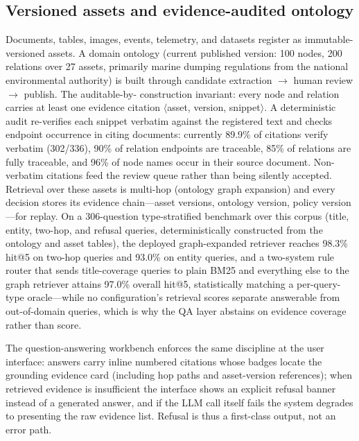 \documentclass[conference]{IEEEtran}
\begin{document}
\subsection{Versioned assets and evidence-audited ontology}
Documents, tables, images, events, telemetry, and datasets register as
immutable-versioned assets. A domain ontology (current published version:
100 nodes, 200 relations over 27 assets, primarily marine dumping
regulations from the national environmental authority) is built through
candidate extraction $\to$ human review $\to$ publish. The auditable-by-
construction invariant: every node and relation carries at least one
evidence citation $\langle$asset, version, snippet$\rangle$. A
deterministic audit re-verifies each snippet verbatim against the registered
text and checks endpoint occurrence in citing documents: currently 89.9\%
of citations verify verbatim (302/336), 90\% of relation endpoints are
traceable, 85\% of relations are fully traceable, and 96\% of node names
occur in their source document. Non-verbatim citations feed the review
queue rather than being silently accepted. Retrieval over these assets is
multi-hop (ontology graph expansion) and every decision stores its evidence
chain---asset versions, ontology version, policy version---for replay. On a
306-question type-stratified benchmark over this corpus (title, entity,
two-hop, and refusal queries, deterministically constructed from the
ontology and asset tables), the deployed graph-expanded retriever reaches
98.3\% hit@5 on two-hop queries and 93.0\% on entity queries, and a
two-system rule router that sends title-coverage queries to plain BM25 and
everything else to the graph retriever attains 97.0\% overall hit@5,
statistically matching a per-query-type oracle---while no configuration's
retrieval scores separate answerable from out-of-domain queries, which is
why the QA layer abstains on evidence coverage rather than score.

The question-answering workbench enforces the same discipline at the user
interface: answers carry inline numbered citations whose badges locate the
grounding evidence card (including hop paths and asset-version references);
when retrieved evidence is insufficient the interface shows an explicit
refusal banner instead of a generated answer, and if the LLM call itself
fails the system degrades to presenting the raw evidence list. Refusal is
thus a first-class output, not an error path.
\end{document}
